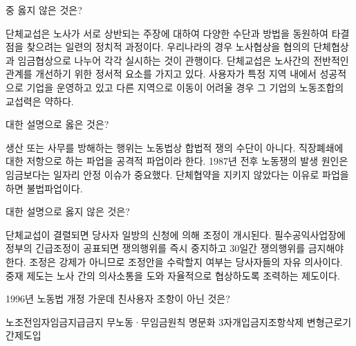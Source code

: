 \documentclass[11pt,answers]{exam} %
\begin{document}
\begin{questions}
 중 옳지 않은 것은?
    \begin{choices}
    \choice\relax 단체교섭은 노사가 서로 상반되는 주장에 대하여 다양한 수단과 방법을 동원하여 타결점을 찾으려는 일련의 정치적 과정이다.
    \choice\relax 우리나라의 경우 노사협상을 협의의 단체협상과 임금협상으로 나누어 각각 실시하는 것이 관행이다.
    \choice\relax 단체교섭은 노사간의 전반적인 관계를 개선하기 위한 정서적 요소를 가지고 있다.
    \CorrectChoice\relax 사용자가 특정 지역 내에서 성공적으로 기업을 운영하고 있고 다른 지역으로 이동이 어려울 경우 그 기업의 노동조합의 교섭력은 약하다.
    \end{choices}

 대한 설명으로 옳은 것은?
    \begin{choices}
    \choice\relax 생산 또는 사무를 방해하는 행위는 노동법상 합법적 쟁의 수단이 아니다.
    \choice\relax 직장폐쇄에 대한 저항으로 하는 파업을 공격적 파업이라 한다.
    \choice\relax 1987년 전후 노동쟁의 발생 원인은 임금보다는 일자리 안정 이슈가 중요했다.
    \CorrectChoice\relax 단체협약을 지키지 않았다는 이유로 파업을 하면 불법파업이다.
    \end{choices}

 대한 설명으로 옳지 않은 것은?
    \begin{choices}
    \choice\relax 단체교섭이 결렬되면 당사자 일방의 신청에 의해 조정이 개시된다.
    \choice\relax 필수공익사업장에 정부의 긴급조정이 공표되면 쟁의행위를 즉시 중지하고 30일간 쟁의행위를 금지해야 한다.
    \choice\relax 조정은 강제가 아니므로 조정안을 수락할지 여부는 당사자들의 자유 의사이다.
    \CorrectChoice\relax 중재 제도는 노사 간의 의사소통을 도와 자율적으로 협상하도록 조력하는 제도이다.
    \end{choices}


\question1996년 노동법 개정 가운데 친사용자 조항이 아닌 것은? 
    \begin{choices}
    \choice\relax 노조전임자임금지급금지   
    \choice\relax 무노동·무임금원칙 명문화 
    \CorrectChoice{}3자개입금지조항삭제
    \choice\relax 변형근로기간제도입       
    \end{choices}


\end{questions}
\end{document}

